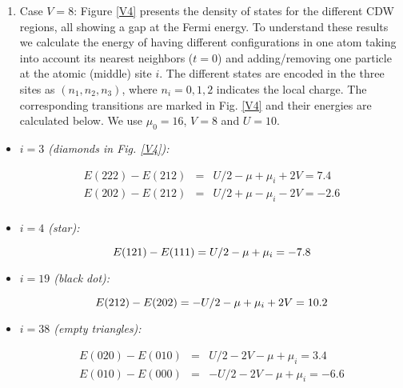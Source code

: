 \documentclass[aps,prl,showpacs,twocolumn,superscriptaddress]{revtex4-2}
\begin{document}
\begin{enumerate}


\item

Case $V=8$: Figure \ref{V4} presents  the density of states for the different CDW regions, all showing a gap at the Fermi energy.
To understand these results we calculate the energy of having different configurations in one atom taking into account its nearest neighbors ($t=0$) and adding/removing one particle at the atomic (middle) site $i$. The different states are encoded in the three sites as $(n_1, n_2, n_3 )$, where $n_i=0,1,2$ indicates the local charge. The corresponding transitions are marked in Fig. \ref{V4} and their energies are calculated below. We use $\mu^{}_0=16$, $V=8$ and $U=10$.


\end{enumerate}


\begin{itemize}
\item \textit{$i=3$ (diamonds in Fig. \ref{V4}):}

\begin{eqnarray}
E(222)-E(212)&=&U/2-\mu+\mu^{}_i+2V=7.4 \nonumber \\
E(202)-E(212)&=&U/2+\mu -\mu_i-2V=-2.6 \nonumber \\ \nonumber
\end{eqnarray}

\item \textit{$i=4$ (star):}

\begin{equation}
E(121)-E(111)=U/2-\mu+\mu_i=-7.8 \nonumber \\
\end{equation}

\item \textit{$i=19$ (black dot):}

\begin{equation}
E(212)-E(202)=-U/2-\mu +\mu_i+2V=10.2 \nonumber \\
\end{equation}

\item \textit{$i=38$ (empty triangles):}

\begin{eqnarray}
E(020)-E(010)&=&U/2-2V-\mu+\mu_i=3.4 \nonumber \\
E(010)-E(000)&=&-U/2-2V-\mu+\mu_i=-6.6 \nonumber \\ \nonumber
\end{eqnarray}

\end{itemize}



\end{document}
